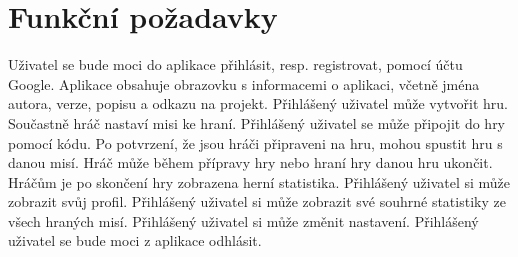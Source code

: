 \section{Funkční požadavky}

\begin{enumerate}[label=\textbf{F\arabic*}, ref=F\arabic*]
Uživatel se bude moci do aplikace přihlásit, resp. registrovat,
pomocí účtu Google.
Aplikace obsahuje obrazovku s informacemi o aplikaci,
včetně jména autora, verze, popisu a odkazu na projekt.
Přihlášený uživatel může vytvořit hru.
Součastně hráč nastaví misi ke hraní.
Přihlášený uživatel se může připojit do hry pomocí kódu.
Po potvrzení, že jsou hráči připraveni na hru,
mohou spustit hru s danou misí.
Hráč může během přípravy hry nebo hraní hry danou hru ukončit.
Hráčům je po skončení hry zobrazena herní statistika.
Přihlášený uživatel si může zobrazit svůj profil.
Přihlášený uživatel si může zobrazit své souhrné statistiky
ze všech hraných misí.
    \label{req:settings}
Přihlášený uživatel si může změnit nastavení.
    \label{req:logout}
Přihlášený uživatel se bude moci z aplikace odhlásit.
\end{enumerate}
